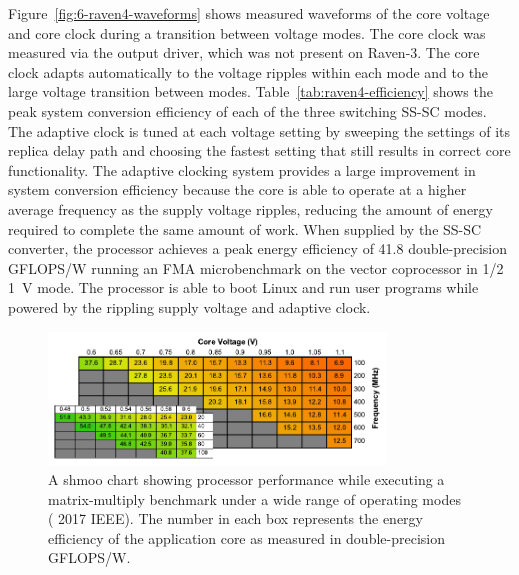 \documentclass[graybox]{svmult}
\begin{document}
Figure~\ref{fig:6-raven4-waveforms} shows measured waveforms of the core voltage and core clock during a transition between voltage modes.
The core clock was measured via the output driver, which was not present on Raven-3.
The core clock adapts automatically to the voltage ripples within each mode and to the large voltage transition between modes.
Table~\ref{tab:raven4-efficiency} shows the peak system conversion efficiency of each of the three switching SS-SC modes.
The adaptive clock is tuned at each voltage setting by sweeping the settings of its replica delay path and choosing the fastest setting that still results in correct core functionality.
The adaptive clocking system provides a large improvement in system conversion efficiency because the core is able to operate at a higher average frequency as the supply voltage ripples, reducing the amount of energy required to complete the same amount of work.
When supplied by the SS-SC converter, the processor achieves a peak energy efficiency of 41.8 double-precision GFLOPS/W running an FMA microbenchmark on the vector coprocessor in 1/2 \SI{1}{\volt} mode.
The processor is able to boot Linux and run user programs while powered by the rippling supply voltage and adaptive clock.


\begin{figure}
  \centering
  \includegraphics[width=0.8\textwidth]{6-raven4-shmoochart}
  \caption{A shmoo chart showing processor performance while executing a matrix-multiply benchmark under a wide range of operating modes~\cite{Keller2017} ({\textcopyright} 2017 IEEE). The number in each box represents the energy efficiency of the application core as measured in double-precision GFLOPS/W.}
  \label{fig:6-raven4-shmoochart}
\end{figure}
\end{document}
